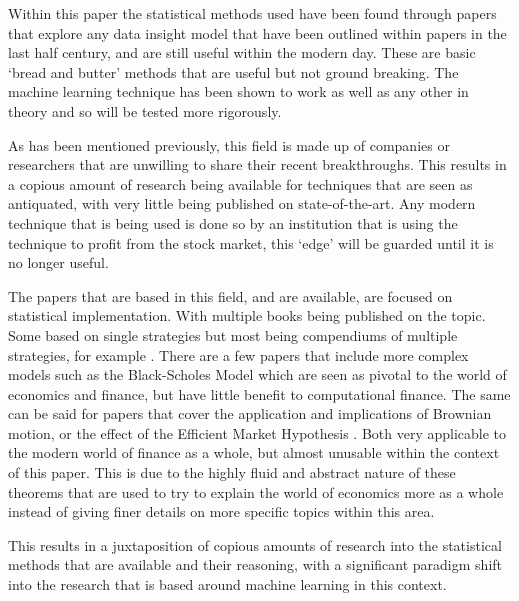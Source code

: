 \documentclass[conference]{IEEEtran}
\begin{document}
Within this paper the statistical methods used have been found through papers that explore any data insight model that have been outlined within papers in the last half century, and are still useful within the modern day. These are basic `bread and butter' methods that are useful but not ground breaking. The machine learning technique has been shown to work as well as any other in theory and so will be tested more rigorously.\\
\fi

As has been mentioned previously, this field is made up of companies or researchers that are unwilling to share their recent breakthroughs. This results in a copious amount of research being available for techniques that are seen as antiquated, with very little being published on state-of-the-art. Any modern technique that is being used is done so by an institution that is using the technique to profit from the stock market, this `edge'  will be guarded until it is no longer useful.

The papers that are based in this field, and are available, are focused on statistical implementation. With multiple books being published on the topic. Some based on single strategies but most being compendiums of multiple strategies, for example \cite{Murphy1999}. There are a few papers that include more complex models such as the Black-Scholes Model \cite{Saad2015} which are seen as pivotal to the world of economics and finance, but have little benefit to computational finance. The same can be said for papers that cover the application and implications of Brownian motion, or the effect of the Efficient Market Hypothesis \cite{Meng2016}. Both very applicable to the modern world of finance as a whole, but almost unusable within the context of this paper. This is due to the highly fluid and abstract nature of these theorems that are used to try to explain the world of economics more as a whole instead of giving finer details on more specific topics within this area.

This results in a juxtaposition of copious amounts of research into the statistical methods that are available and their reasoning, with a significant paradigm shift into the research that is based around machine learning in this context.
\end{document}
